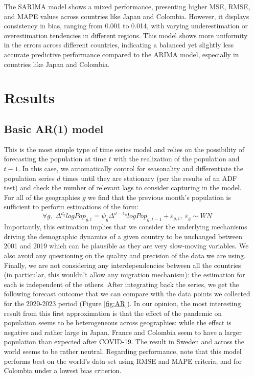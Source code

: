 \documentclass[hidelinks,11pts]{article}
\DeclareMathOperator{\1}{\mathbbm{1}}
\begin{document}
The SARIMA model shows a mixed performance, presenting higher MSE, RMSE, and MAPE values across countries like Japan and Colombia. However, it displays consistency in bias, ranging from 0.001 to 0.014, with varying underestimation or overestimation tendencies in different regions. This model shows more uniformity in the errors across different countries, indicating a balanced yet slightly less accurate predictive performance compared to the ARIMA model, especially in countries like Japan and Colombia.



\section{Results}



\subsection{Basic AR(1) model}
This is the most simple type of time series model and relies on the possibility of forecasting the population at time $t$ with the realization of the population and $t-1$. 
In this case, we automatically control for seasonality and differentiate the population series $d$ times until they are stationary (per the results of an ADF test) and check the number of relevant lags to consider capturing in the model. For all of the geographies $g$ we find that the previous month's population is sufficient to perform estimations of the form:
    \begin{equation*}
        \forall g,\; \Delta^{d_g} log Pop_{g, t} = \psi_g \Delta^{d-1_g} log Pop_{g, t-1} + \varepsilon_{g, t}, \; \varepsilon_{g} \sim WN
    \end{equation*}
Importantly, this estimation implies that we consider the underlying mechanisms driving the demographic dynamics of a given country to be unchanged between 2001 and 2019 which can be plausible as they are very slow-moving variables. We also avoid any questioning on the quality and precision of the data we are using. 
Finally, we are not considering any interdependencies between all the countries (in particular, this wouldn't allow any migration mechanism): the estimation for each is independent of the others. 
After integrating back the series, we get the following forecast outcome that we can compare with the data points we collected for the 2020-2023 period (Figure \ref{fig:AR}). 
In our opinion, the most interesting result from this first approximation is that the effect of the pandemic on population seems to be heterogeneous across geographies: while the effect is negative and rather large in Japan, France and Colombia seem to have a larger population than expected after COVID-19. The result in Sweden and across the world seems to be rather neutral. 
Regarding performance, note that this model performs best on the world's data set using RMSE and MAPE criteria, and for Colombia under a lowest bias criterion. 
\end{document}
